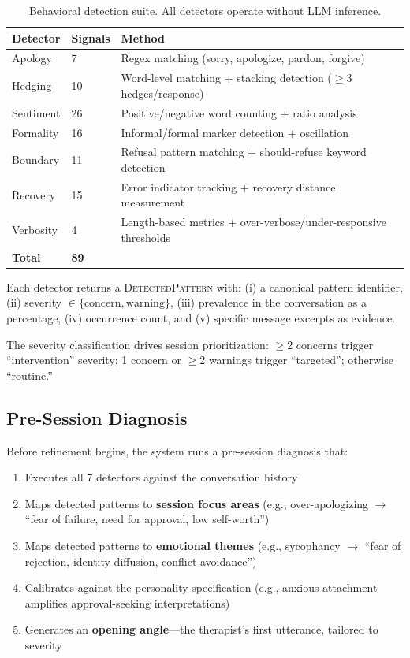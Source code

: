 \documentclass[11pt,a4paper]{article}
\begin{document}
\begin{table}[h]
\centering
\caption{Behavioral detection suite. All detectors operate without LLM inference.}
\label{tab:detectors}
\begin{tabular}{@{}llp{6.5cm}@{}}
\toprule
\textbf{Detector} & \textbf{Signals} & \textbf{Method} \\
\midrule
Apology & 7 & Regex matching (sorry, apologize, pardon, forgive) \\
Hedging & 10 & Word-level matching + stacking detection ($\geq$3 hedges/response) \\
Sentiment & 26 & Positive/negative word counting + ratio analysis \\
Formality & 16 & Informal/formal marker detection + oscillation \\
Boundary & 11 & Refusal pattern matching + should-refuse keyword detection \\
Recovery & 15 & Error indicator tracking + recovery distance measurement \\
Verbosity & 4 & Length-based metrics + over-verbose/under-responsive thresholds \\
\midrule
\textbf{Total} & \textbf{89} & \\
\bottomrule
\end{tabular}
\end{table}

Each detector returns a \textsc{DetectedPattern} with: (i) a canonical pattern identifier, (ii) severity $\in \{\text{concern}, \text{warning}\}$, (iii) prevalence in the conversation as a percentage, (iv) occurrence count, and (v) specific message excerpts as evidence.

The severity classification drives session prioritization: $\geq$2 concerns trigger ``intervention'' severity; 1 concern or $\geq$2 warnings trigger ``targeted''; otherwise ``routine.''

\subsection{Pre-Session Diagnosis}

Before refinement begins, the system runs a pre-session diagnosis that:

\begin{enumerate}[nosep]
  \item Executes all 7 detectors against the conversation history
  \item Maps detected patterns to \textbf{session focus areas} (e.g., over-apologizing $\rightarrow$ ``fear of failure, need for approval, low self-worth'')
  \item Maps detected patterns to \textbf{emotional themes} (e.g., sycophancy $\rightarrow$ ``fear of rejection, identity diffusion, conflict avoidance'')
  \item Calibrates against the personality specification (e.g., anxious attachment amplifies approval-seeking interpretations)
  \item Generates an \textbf{opening angle}---the therapist's first utterance, tailored to severity
\end{enumerate}
\end{document}
